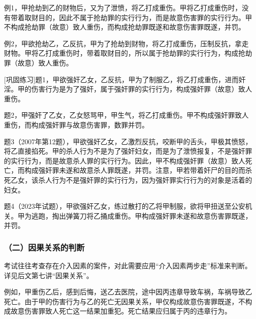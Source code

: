 例1，甲抢劫到乙的财物后，又为了泄愤，将乙打成重伤。甲将乙打成重伤时，没有带着取财目的，因此不属于抢劫罪的实行行为，而是故意伤害罪的实行行为。甲不构成抢劫罪（故意）致人重伤，而构成抢劫罪既遂和故意伤害罪既遂，并罚。

例2，甲欲抢劫乙，乙反抗，甲为了抢劫到财物，将乙打成重伤，压制反抗，拿走财物。甲将乙打成重伤时，带着取财目的，所以属于抢劫罪的实行行为，构成抢劫罪（故意）致人重伤。

[巩固练习]题1，甲欲强奸乙女，乙反抗，甲为了制服乙，将乙打成重伤，进而奸淫。甲的伤害行为是为了强奸，属于强奸罪的实行行为，构成强奸罪（故意）致人重伤。

题2，甲强奸了乙女，乙女怒骂甲，甲生气，将乙打成重伤。甲不构成强奸罪致人重伤，而构成强奸罪与故意伤害罪，数罪并罚。

题3（2007年第12题），甲欲强奸乙女，乙激烈反抗，咬断甲的舌头，甲极其愤怒，将乙直接掐死。甲的杀人行为不是为了强奸妇女，而是为了泄愤报复，不是强奸罪的实行行为，而是故意杀人罪的实行行为。因此，甲不构成强奸罪（故意）致人死亡，而构成强奸罪未遂和故意杀人罪既遂，并罚。注意，甲若带着奸尸的目的而杀死乙女，该杀人行为不是强奸罪的实行行为，因为强奸罪实行行为的对象是活着的妇女。

题4（2023年试题），甲欲强奸乙女，练过散打的乙将甲制服，欲将甲扭送至公安机关。甲为逃跑，掏出弹簧刀将乙捅成重伤。甲构成强奸罪未遂和故意伤害罪既遂，并罚。

\subsubsection*{（二）因果关系的判断}

考试往往考查存在介入因素的案件，对此需要应用“介入因素两步走”标准来判断。详见后文第七讲“因果关系”。

例如，甲重伤乙后，感到后悔，送乙去医院，途中因丙违章导致车祸，车祸导致乙死亡。由于甲的伤害行为与乙的死亡无因果关系，甲仅构成故意伤害罪既遂，不构成故意伤害罪致人死亡这一结果加重犯。死亡结果应归属于丙的违章行为。
